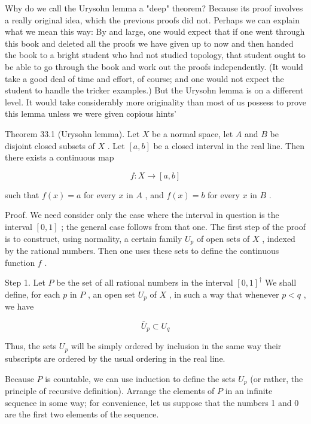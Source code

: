 \documentclass[10pt]{article}
\begin{document}
Why do we call the Urysohn lemma a "deep" theorem? Because its proof involves a really original idea, which the previous proofs did not. Perhaps we can explain what we mean this way: By and large, one would expect that if one went through this book and deleted all the proofs we have given up to now and then handed the book to a bright student who had not studied topology, that student ought to be able to go through the book and work out the proofs independently. (It would take a good deal of time and effort, of course; and one would not expect the student to handle the tricker examples.) But the Urysohn lemma is on a different level. It would take considerably more originality than most of us possess to prove this lemma unless we were given copious hints'

Theorem 33.1 (Urysohn lemma). Let \(X\) be a normal space, let \(A\) and \(B\) be disjoint closed subsets of \(X\) . Let \(\left\lbrack  {a,b}\right\rbrack\) be a closed interval in the real line. Then there exists a continuous map

\[
f : X \rightarrow  \left\lbrack  {a,b}\right\rbrack
\]

such that \(f\left( x\right)  = a\) for every \(x\) in \(A\) , and \(f\left( x\right)  = b\) for every \(x\) in \(B\) .

Proof. We need consider only the case where the interval in question is the interval \(\left\lbrack  {0,1}\right\rbrack\) ; the general case follows from that one. The first step of the proof is to construct, using normality, a certain family \({U}_{p}\) of open sets of \(X\) , indexed by the rational numbers. Then one uses these sets to define the continuous function \(f\) .

Step 1. Let \(P\) be the set of all rational numbers in the interval \({\left\lbrack  0,1\right\rbrack  }^{ \dagger  }\) We shall define, for each \(p\) in \(P\) , an open set \({U}_{p}\) of \(X\) , in such a way that whenever \(p < q\) , we have

\[
{\bar{U}}_{p} \subset  {U}_{q}
\]

Thus, the sets \({U}_{p}\) will be simply ordered by inclusion in the same way their subscripts are ordered by the usual ordering in the real line.

Because \(P\) is countable, we can use induction to define the sets \({U}_{p}\) (or rather, the principle of recursive definition). Arrange the elements of \(P\) in an infinite sequence in some way; for convenience, let us suppose that the numbers 1 and 0 are the first two elements of the sequence.
\end{document}
